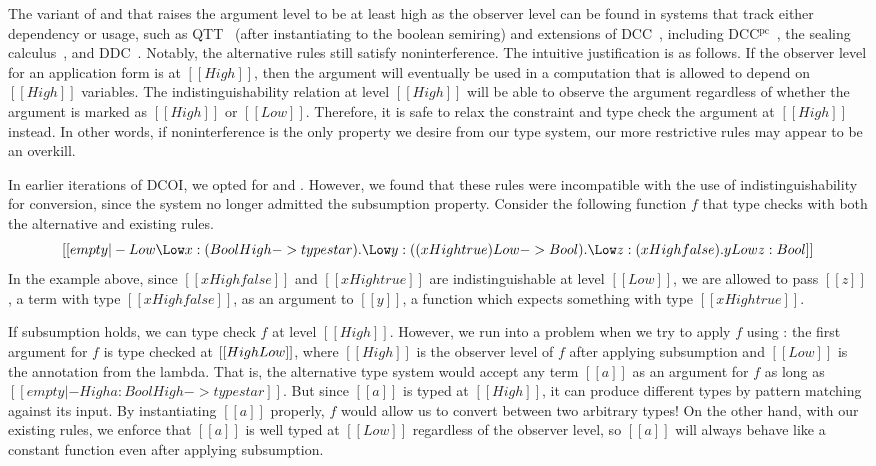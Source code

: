 \documentclass[acmsmall]{acmart}
\newcommand{\name}{DCOI\xspace}
\begin{document}
The variant of  and  that raises the argument
level to be at least high as the observer level can be found in
systems that track either dependency or usage,
such as
QTT~\citep{atkey2018syntax} (after instantiating to the boolean semiring) and
extensions of DCC~\citep{abadi1999core},
including DCC$^{\text{pc}}$~\citep{tse2004translating}, the sealing
calculus~\citep{shikuma2008proving}, and DDC~\citep{choudhury:ddc}.
Notably, the alternative rules still satisfy noninterference.
\ifextended
The intuitive justification is as follows. If
the observer level for an application form is at $[[High]]$, then the
argument will eventually be used in a computation that is allowed to
depend on $[[High]]$ variables. The indistinguishability relation at
level $[[High]]$ will be able to observe the argument regardless of whether the
argument is marked as $[[High]]$ or $[[Low]]$. Therefore, it is safe
to relax the constraint and type check the argument at $[[High]]$
instead. In other words, if noninterference is the only property we
desire from our type system, our more restrictive rules may appear to
be an overkill.
\fi

In earlier iterations of \name{}, we opted for  and .
However, we found that these rules were incompatible
with the use of indistinguishability for conversion,
since the system no longer
admitted the subsumption property.
Consider the following function $f$ that type checks
with both the alternative and existing rules.
\[ [[ empty |- Low \Low x : (Bool High -> type star) . \Low y : ((x High true) Low -> Bool) . \Low z : (x High false) . y Low z : Bool ]]  \]
In the example above, since $[[x High false]]$ and $[[x High true]]$ are
indistinguishable at level $[[Low]]$,
we are allowed to pass $[[z]]$, a term with
type $[[x High false]]$, as an argument to $[[y]]$, a function which
expects something with type $[[x High true]]$.

If subsumption holds, we can type check $f$ at level $[[High]]$.
However, we run into a problem when we try to apply $f$ using
: the first argument for $f$ is type checked
at $[[High \/ Low]]$, where $[[High]]$ is the observer level
of $f$ after applying subsumption and $[[Low]]$ is the annotation from the lambda. That is, the
alternative type system would accept any term $[[a]]$ as an argument
for $f$
as long as $[[empty |- High a : Bool High -> type star]]$.
But since $[[a]]$ is typed at $[[High]]$, it can
produce different types by pattern matching against its
input. By instantiating $[[a]]$ properly, $f$ would allow us
to convert between two arbitrary types!
On the other hand, with our existing rules, we enforce that $[[a]]$ is
well typed at $[[Low]]$ regardless of the observer level, so
$[[a]]$ will always behave
like a constant function even after applying subsumption.
\end{document}
